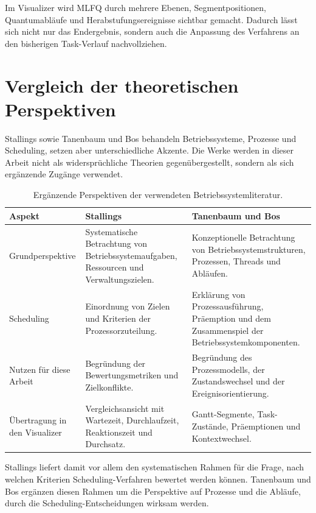 Im Visualizer wird MLFQ durch mehrere Ebenen, Segmentpositionen, Quantumabläufe und Herabstufungsereignisse sichtbar gemacht. Dadurch lässt sich nicht nur das Endergebnis, sondern auch die Anpassung des Verfahrens an den bisherigen Task-Verlauf nachvollziehen.

\section{Vergleich der theoretischen Perspektiven}

Stallings sowie Tanenbaum und Bos behandeln Betriebssysteme, Prozesse und Scheduling, setzen aber unterschiedliche Akzente. Die Werke werden in dieser Arbeit nicht als widersprüchliche Theorien gegenübergestellt, sondern als sich ergänzende Zugänge verwendet.

\begin{table}[H]
\centering
\caption{Ergänzende Perspektiven der verwendeten Betriebssystemliteratur.}
\label{tab:buchvergleich}
\small
\begin{tabularx}{\textwidth}{>{\raggedright\arraybackslash}p{}>{\raggedright\arraybackslash}X >{\raggedright\arraybackslash}X}
\textbf{Aspekt} & \textbf{Stallings} & \textbf{Tanenbaum und Bos} \\
\hline
Grundperspektive & Systematische Betrachtung von Betriebssystemaufgaben, Ressourcen und Verwaltungszielen. & Konzeptionelle Betrachtung von Betriebssystemstrukturen, Prozessen, Threads und Abläufen. \\
Scheduling & Einordnung von Zielen und Kriterien der Prozessorzuteilung. & Erklärung von Prozessausführung, Präemption und dem Zusammenspiel der Betriebssystemkomponenten. \\
Nutzen für diese Arbeit & Begründung der Bewertungsmetriken und Zielkonflikte. & Begründung des Prozessmodells, der Zustandswechsel und der Ereignisorientierung. \\
Übertragung in den Visualizer & Vergleichsansicht mit Wartezeit, Durchlaufzeit, Reaktionszeit und Durchsatz. & Gantt-Segmente, Task-Zustände, Präemptionen und Kontextwechsel. \\
\end{tabularx}
\end{table}

Stallings liefert damit vor allem den systematischen Rahmen für die Frage, nach welchen Kriterien Scheduling-Verfahren bewertet werden können. Tanenbaum und Bos ergänzen diesen Rahmen um die Perspektive auf Prozesse und die Abläufe, durch die Scheduling-Entscheidungen wirksam werden.

